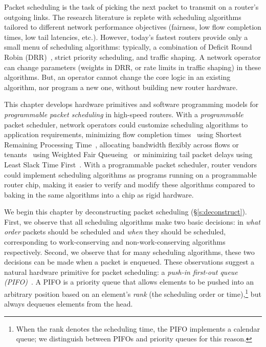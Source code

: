 Packet scheduling is the task of picking the next packet to transmit on a
router's outgoing links. The research literature is replete with scheduling
algorithms~\cite{wfq, srr, lstf, drr, pFabric} tailored to different network
performance objectives (\eg fairness, low flow completion times, low tail
latencies, etc.).  However, today's fastest routers provide only a small menu
of scheduling algorithms: typically, a combination of Deficit Round Robin
(DRR)~\cite{drr}, strict priority scheduling, and traffic shaping. A network
operator can change parameters (\eg weights in DRR, or rate limits in traffic
shaping) in these algorithms. But, an operator cannot change the core logic in
an existing algorithm, nor program a new one, without building new router
hardware.

 This chapter develops hardware primitives and software programming models for
{\em programmable packet scheduling} in high-speed routers. With a {\em
programmable} packet scheduler, network operators could customize scheduling
algorithms to application requirements, \eg minimizing flow completion
times~\cite{pFabric} using Shortest Remaining Processing Time~\cite{srpt},
allocating bandwidth flexibly across flows or tenants~\cite{eyeq, faircloud}
using Weighted Fair Queueing~\cite{wfq} or minimizing tail packet delays using
Least Slack Time First~\cite{lstf}.  With a programmable packet scheduler,
router vendors could implement scheduling algorithms as programs running on a
programmable router chip, making it easier to verify and modify these
algorithms compared to baking in the same algorithms into a chip as rigid
hardware.

We begin this chapter by deconstructing packet scheduling
(\S\ref{s:deconstruct}). First, we observe that all scheduling algorithms make
two basic decisions: in {\em what order} packets should be scheduled and {\em
when} they should be scheduled, corresponding to work-conserving and
non-work-conserving algorithms respectively.  Second, we observe that for many
scheduling algorithms, these two decisions can be made when a packet is
enqueued. These observations suggest a natural hardware primitive for packet
scheduling: a {\em push-in first-out queue (PIFO)}~\cite{pifo}. A PIFO is a
priority queue that allows elements to be pushed into an arbitrary position
based on an element's {\em rank} (the scheduling order or time),\footnote{When
the rank denotes the scheduling time, the PIFO implements a calendar queue; we
distinguish between PIFOs and priority queues for this reason.} but always
dequeues elements from the head.

